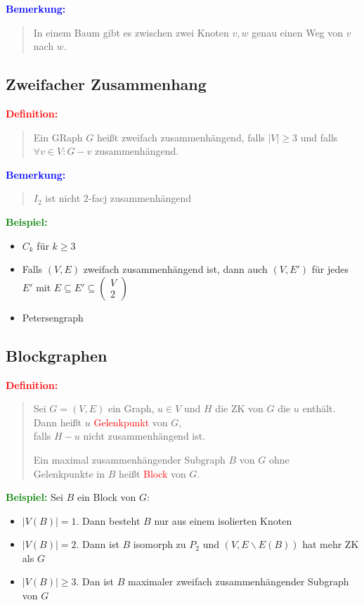 \documentclass{article}
\newcommand{\red}[1]{\textcolor{red}{#1}}
\newcommand{\blue}[1]{\textcolor{blue}{#1}}
\newcommand{\green}[1]{\textcolor{green}{#1}}
\newcommand{\ex}{\green{\textbf{Beispiel: }}}
\newcommand{\de}[1]{\red{\textbf{Definition: }}\begin{quote}#1\end{quote}}
\newcommand{\an}[1]{\blue{\textbf{Bemerkung: }}\begin{quote}#1\end{quote}}
\newcommand{\vvec}[2]{\begin{pmatrix}#1\\#2\end{pmatrix}}
\begin{document}
\an{
    In einem Baum gibt es zwischen zwei Knoten $v,w$ genau einen Weg von $v$ nach $w$.
}

\subsection{Zweifacher Zusammenhang}

\de{
    Ein GRaph $G$ heißt zweifach zusammenhängend, falls $|V| \ge 3$ und falls $\forall v \in V: G-v$ zusammenhängend.
}

\an{
    $I_2$ ist nicht $2$-facj zusammenhängend
}

\ex \begin{itemize}
    \item $C_k$ für $k \ge 3$
    \item Falls $(V,E)$ zweifach zusammenhängend ist, dann auch $(V,E')$ für jedes $E'$ mit $E \subseteq E' \subseteq \vvec{V}{2}$
    \item Petersengraph
\end{itemize}

\subsection{Blockgraphen}

\de{
    Sei $G=(V,E)$ ein Graph, $u \in V$ und $H$ die ZK von $G$ die $u$ enthält.\\
    Dann heißt $u$ \red{Gelenkpunkt} von $G$,\\
    falls $H-u$ nicht zusammenhängend ist.

    Ein maximal zusammenhängender Subgraph $B$ von $G$ ohne\\
    Gelenkpunkte in $B$ heißt \red{Block} von $G$.
}

\ex Sei $B$ ein Block von $G$:
\begin{itemize}
    \item $|V(B)| = 1$. Dann besteht $B$ nur aus einem isolierten Knoten
    \item $|V(B)| = 2$. Dann ist $B$ isomorph zu $P_2$ und $(V, E \backslash E(B))$ hat mehr ZK als $G$
    \item $|V(B)| \ge 3$. Dan ist $B$ maximaler zweifach zusammenhängender Subgraph von $G$
\end{itemize}
\end{document}

